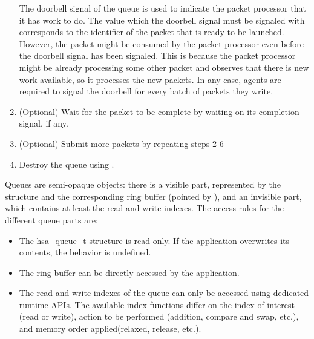 \documentclass[final,oneside]{book}
\begin{document}
\begin{enumerate}[itemsep=1pt,topsep=3pt,partopsep=0pt]
  The doorbell signal of the queue is used to indicate the packet processor that
it has work to do. The value which the doorbell signal must be signaled with
corresponds to the identifier of the packet that is ready to be launched.
However, the packet might be consumed by the packet processor even
before the doorbell signal has been signaled. This is because the packet
processor might be already processing some other packet and observes that there
is new work available, so it processes the new packets. In any case, agents are
required to signal the doorbell for every batch of packets they write.

\item (Optional) Wait for the packet to be complete by waiting on its completion
  signal, if any.

\item (Optional) Submit more packets by repeating steps 2-6

\item Destroy the queue using .
\end{enumerate}

Queues are semi-opaque objects: there is a visible part, represented by the
 structure and the corresponding ring buffer (pointed by
), and an invisible part, which contains at
least the read and write indexes. The access rules for the different queue parts
are:
\begin{itemize}[itemsep=1pt,topsep=3pt,partopsep=0pt]
\item The {hsa_queue_t} structure is read-only. If the application overwrites
  its contents, the behavior is undefined.
\item The ring buffer can be directly accessed by the application.
\item The read and write indexes of the queue can only be accessed using
  dedicated runtime APIs.  The available index functions differ on the index of
  interest (read or write), action to be performed (addition, compare and swap,
  etc.), and memory order applied(relaxed, release, etc.).
\end{itemize}


\end{document}
